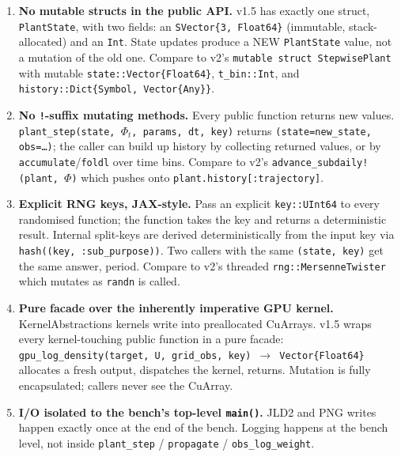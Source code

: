 \documentclass[11pt,a4paper]{article}
\begin{document}
\begin{enumerate}[itemsep=4pt,leftmargin=*]
\item \textbf{No mutable structs in the public API.}
  v1.5 has exactly one struct, \texttt{PlantState}, with two fields:
  an \texttt{SVector\{3, Float64\}} (immutable, stack-allocated) and
  an \texttt{Int}. State updates produce a NEW \texttt{PlantState}
  value, not a mutation of the old one. Compare to v2's
  \texttt{mutable struct StepwisePlant} with mutable
  \texttt{state::Vector\{Float64\}}, \texttt{t\_bin::Int}, and
  \texttt{history::Dict\{Symbol, Vector\{Any\}\}}.

\item \textbf{No \texttt{!}-suffix mutating methods.}
  Every public function returns new values. \texttt{plant\_step(state,
  $\Phi_t$, params, dt, key)} returns \texttt{(state=new\_state,
  obs=\dots)}; the caller can build up history by collecting returned
  values, or by \texttt{accumulate}/\texttt{foldl} over time bins.
  Compare to v2's \texttt{advance\_subdaily!(plant, $\Phi$)} which
  pushes onto \texttt{plant.history[:trajectory]}.

\item \textbf{Explicit RNG keys, JAX-style.}
  Pass an explicit \texttt{key::UInt64} to every randomised function;
  the function takes the key and returns a deterministic result.
  Internal split-keys are derived deterministically from the input
  key via \texttt{hash((key, :sub\_purpose))}. Two callers with the
  same \texttt{(state, key)} get the same answer, period. Compare to
  v2's threaded \texttt{rng::MersenneTwister} which mutates as
  \texttt{randn} is called.

\item \textbf{Pure facade over the inherently imperative GPU kernel.}
  KernelAbstractions kernels write into preallocated CuArrays. v1.5
  wraps every kernel-touching public function in a pure facade:
  \texttt{gpu\_log\_density(target, U, grid\_obs, key)\,$\to$\,Vector\{Float64\}}
  allocates a fresh output, dispatches the kernel, returns. Mutation
  is fully encapsulated; callers never see the CuArray.

\item \textbf{I/O isolated to the bench's top-level \texttt{main()}.}
  JLD2 and PNG writes happen exactly once at the end of the bench.
  Logging happens at the bench level, not inside \texttt{plant\_step}
  / \texttt{propagate} / \texttt{obs\_log\_weight}.
\end{enumerate}
\end{document}
